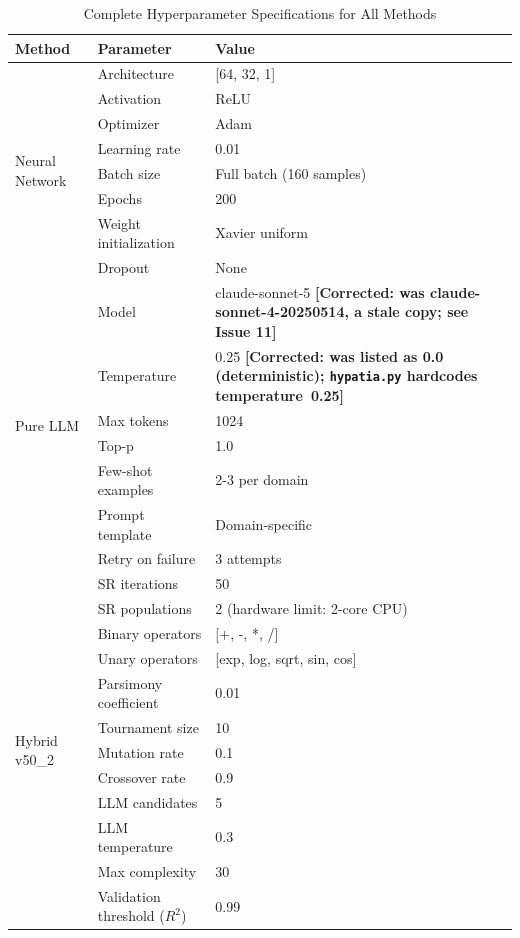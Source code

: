 \documentclass[twoside,11pt]{article}
\begin{document}
\begin{table}[H]
\centering
\caption{Complete Hyperparameter Specifications for All Methods}
\label{tab:hyperparameters_complete}
\small
\begin{tabular}{lll}
\toprule
\textbf{Method} & \textbf{Parameter} & \textbf{Value} \\
\midrule
\multirow{8}{*}{Neural Network} 
& Architecture & [64, 32, 1] \\
& Activation & ReLU \\
& Optimizer & Adam \\
& Learning rate & 0.01 \\
& Batch size & Full batch (160 samples) \\
& Epochs & 200 \\
& Weight initialization & Xavier uniform \\
& Dropout & None \\
\midrule
\multirow{7}{*}{Pure LLM}
& Model & claude-sonnet-5 \textbf{[Corrected: was
  claude-sonnet-4-20250514, a stale copy; see Issue 11]} \\
& Temperature & 0.25 \textbf{[Corrected: was listed as 0.0
  (deterministic); \texttt{hypatia.py} hardcodes temperature~0.25]} \\
& Max tokens & 1024 \\
& Top-p & 1.0 \\
& Few-shot examples & 2-3 per domain \\
& Prompt template & Domain-specific \\
& Retry on failure & 3 attempts \\
\midrule
\multirow{12}{*}{Hybrid v50\_2}
& SR iterations & 50 \\
& SR populations & 2 (hardware limit: 2-core CPU) \\
& Binary operators & [+, -, *, /] \\
& Unary operators & [exp, log, sqrt, sin, cos] \\
& Parsimony coefficient & 0.01 \\
& Tournament size & 10 \\
& Mutation rate & 0.1 \\
& Crossover rate & 0.9 \\
& LLM candidates & 5 \\
& LLM temperature & 0.3 \\
& Max complexity & 30 \\
& Validation threshold ($R^2$) & 0.99 \\
\bottomrule
\end{tabular}
\end{table}
\end{document}
